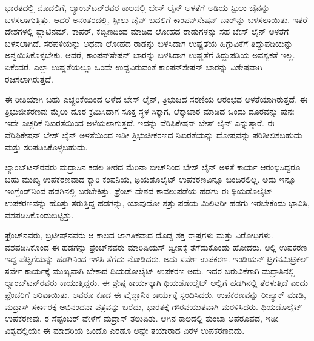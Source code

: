 ಭಾರತದಲ್ಲಿ ಮೊದಲಿಗೆ, ಲ್ಯಾಂಬ್​ಟನ್​ರವರ ಕಾಲದಲ್ಲಿ ಬೇಸ್​ ಲೈನ್​ ಅಳತೆಗೆ  ಅಡಿಯ ಸ್ಟೀಲು ಚೈನನ್ನು ಬಳಸಲಾಗುತ್ತಿತ್ತು. ಆದರೆ ಅನಂತರದಲ್ಲಿ, ಸ್ಟೀಲು ಚೈನ್​ ಬದಲಿಗೆ ಕಾಂಪನ್​ಸೇಷನ್​ ಬಾರ್​ನ್ನು ಬಳಸಲಾಯಿತು. ಇತರೆ ದೇಶಗಳಲ್ಲಿ ಪ್ಲಾಟಿನಮ್, ಕಾಪರ್​, ಕಬ್ಬಿಣದಿಂದ ಮಾಡಿದ ಲೋಹದ ರಾಡುಗಳನ್ನು ಸಹ ಬೇಸ್​ ಲೈನ್​ ಅಳತೆಗೆ ಬಳಸಲಾಗಿದೆ. ಸರಪಳಿಯನ್ನು ಅಥವಾ ಲೋಹದ ರಾಡನ್ನು ಬಳಸಿದಾಗ ಉಷ್ಣತೆಯ ಹಿಗ್ಗುವಿಕೆಗೆ ತಿದ್ದುಪಡಿಯನ್ನು ಅನ್ವಯಿಸಿಕೊಳ್ಳಬೇಕು. ಆದರೆ, ಕಾಂಪನ್​ಸೇಷನ್​ ಬಾರನ್ನು ಬಳಸಿದಾಗ ಉಷ್ಣತೆಗೆ ತಿದ್ದುಪಡಿಯ ಅವಶ್ಯಕತೆ ಇಲ್ಲ. ಏಕೆಂದರೆ, ಎಲ್ಲಾ ಉಷ್ಣತೆಯಲ್ಲೂ ಒಂದೇ ಉದ್ದವಿರುವಂತೆ ಕಾಂಪನ್​ಸೇಷನ್​ ಬಾರನ್ನು ವಿಶೇಷವಾಗಿ ರಚಿಸಲಾಗಿರುತ್ತದೆ.

\newpage

ಈ ರೀತಿಯಾಗಿ ಬಹು ಎಚ್ಚರಿಕೆಯಿಂದ ಅಳೆದ ಬೇಸ್​ ಲೈನ್​, ತ್ರಿಭುಜದ ಸರಣಿಯ ಆರಂಭದ ಅಳತೆಯಾಗಿರುತ್ತದೆ. ಈ ತ್ರಿಭುಜೀಕರಣವು  ಮೈಲು ದೂರ ಕ್ರಮಿಸಿದಾಗ ಸೂಕ್ತ ಸ್ಥಳ ಸಿಕ್ಕಾಗ, ಲೆಕ್ಕಾಚಾರ ಮಾಡಿದ ಒಂದು ದೂರವನ್ನು ಪುನಃ ಇದೇ ಎಚ್ಚರಿಕೆ ನಿಖರತೆಯಿಂದ ಅಳೆಯಲಾಗುತ್ತದೆ. ಇದನ್ನು ವೆರಿಫಿಕೇಷನ್​ ಬೇಸ್​ ಲೈನ್​ ಎನ್ನುತ್ತಾರೆ. ಈ ವೆರಿಫಿಕೇಷನ್​ ಬೇಸ್​ ಲೈನ್​ ಅಳತೆಯಿಂದ ಇಡೀ ತ್ರಿಭುಜೀಕರಣದ ನಿಖರತೆಯನ್ನು ದೋಷವನ್ನು ಪರಿಶೀಲಿಸಬಹುದು ಮತ್ತು ಸರಿಪಡಿಸಿಕೊಳ್ಳಬಹುದು.

ಲ್ಯಾಂಬ್​ಟನ್​ರವರು ಮದ್ರಾಸಿನ ಕಡಲ ತೀರದ ಮೆರಿನಾ ಬೀಚ್​ನಿಂದ ಬೇಸ್​ ಲೈನ್​ ಅಳತೆ ಕಾರ್ಯ ಆರಂಭಿಸಿದ್ದರೂ ಬಹು ಮುಖ್ಯ ಉಪಕರಣವಾದ ಕ್ಯಾರಿ ಕಂಪನಿಯ, ಥಿಯಡೊಲೈಟ್​ ಉಪಕರಣವಿನ್ನೂ ಬಂದಿರಲಿಲ್ಲ. ಅದು ಇನ್ನೂ ಇಂಗ್ಲೆಂಡ್​ನಿಂದ ಹಡಗಿನಲ್ಲಿ ಬರಬೇಕಿತ್ತು. ಫ್ರೆಂಚ್​ ದೇಶದ ಕಾವಲುಪಡೆಯ ಹಡಗು ಈ ಥಿಯಡೊಲೈಟ್​ ಉಪಕರಣವನ್ನು ಹೊತ್ತು ತರುತ್ತಿದ್ದ ಹಡಗನ್ನು, ಯಾವುದೋ ಶತ್ರು ಪಡೆಯ ಮಿಲಿಟರೀ ಹಡಗು ಇರಬೇಕೆಂದು ಭಾವಿಸಿ, ವಶಪಡಿಸಿಕೊಂಡುಬಿಟ್ಟಿತ್ತು.

ಫ್ರೆಂಚ್​ನವರು, ಬ್ರಿಟೀಷ್​ನವರು ಆ ಕಾಲದ ಜಾಗತಿಕವಾದ ದೊಡ್ಡ ಶಕ್ತ ರಾಷ್ರಗಳು ಮತ್ತು ವಿರೋಧಿಗಳು. ವಶಪಡಿಸಿಕೊಂಡ ಈ ಹಡಗನ್ನು ಫ್ರೆಂಚ್​ನವರು ಮಾರಿಷಿಯಸ್​ ದ್ವೀಪಕ್ಕೆ ತೆಗೆದುಕೊಂಡು ಹೋದರು. ಅಲ್ಲಿ ಉಪಕರಣ ಇದ್ದ ಪೆಟ್ಟಿಗೆಯನ್ನು ಹಡಗಿನಿಂದ ಇಳಿಸಿ ತೆಗೆದು ನೋಡಿದರು. ಅದು ಸರ್ವೇ ಉಪಕರಣ. ಇಂಡಿಯನ್​ ಟ್ರಿಗನಮಿಟ್ರಿಕಲ್​ ಸರ್ವೇ ಕಾರ್ಯಕ್ಕೆ ಮುಖ್ಯವಾಗಿ ಬೇಕಾದ ಥಿಯಡೋಲೈಟ್​ ಉಪಕರಣ ಅದು. ಇದರ ಬರುವಿಕೆಗಾಗಿ ಮದ್ರಾಸಿನಲ್ಲಿ ಲ್ಯಾಂಬ್​ಟನ್​ರವರು ಕಾಯುತ್ತಿದ್ದರು. ಈ ಶ್ರೇಷ್ಠ ಕಾರ್ಯಕ್ಕಾಗಿ ಥಿಯಡೋಲೈಟ್​ ಅಲ್ಲಿಗೆ ಹಡಗಿನಲ್ಲಿ ತೆರಳುತ್ತಿದೆ ಎಂದು ಫ್ರೆಂಚರಿಗೆ ಅರಿವಾಯಿತು. ಅವರೂ ಕೂಡ ಈ ವೈಜ್ಞಾನಿಕ ಕಾರ್ಯಕ್ಕೆ ಸ್ಪಂದಿಸಿದರು. ಉಪಕರಣವನ್ನು ರೀಪ್ಯಾಕ್​ ಮಾಡಿ, ಮದ್ರಾಸ್​ ಸರ್ಕಾರಕ್ಕೆ ಅಭಿನಂದನಾ ಪತ್ರವನ್ನು ಬರೆದು, ಭಾರತಕ್ಕೆ ಗೌರವಯುತವಾಗಿ ಮರಳಿಸಿದರು. ಥಿಯಡೊಲೈಟ್​ ಉಪಕರಣವು, ರ ಸೆಪ್ಟಂಬರ್​ ವೇಳೆಗೆ ಮದ್ರಾಸ್​ ತಲುಪಿತು. ಆಗಿನ ಕಾಲದಲ್ಲಿ ತುಂಬಾ ಅಪರೂಪದ, ಇಡೀ ವಿಶ್ವದಲ್ಲಿಯೇ ಈ ಮಾದರಿಯ ಒಂದೊ ಎರಡೊ ಅಷ್ಟೇ ತಯಾರಾದ ವಿರಳ ಉಪಕರಣವದು.

